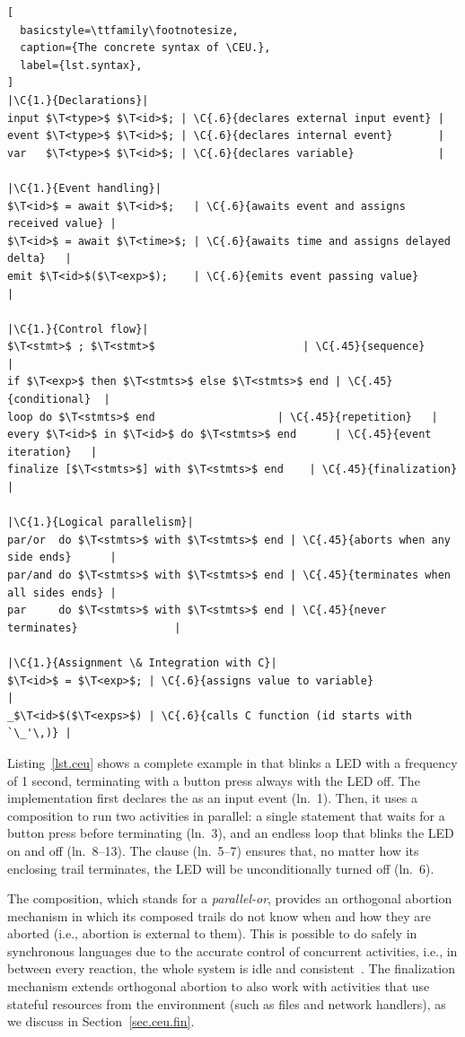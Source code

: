 \bgroup
\def\T<#1>{\langle\mathit{#1}\rangle}
\def\C#1#2{\hfill\rmfamily\itshape\makebox[#1\columnwidth][l]{//~#2}}
\begin{lstlisting}[
  basicstyle=\ttfamily\footnotesize,
  caption={The concrete syntax of \CEU.},
  label={lst.syntax},
]
|\C{1.}{Declarations}|
input $\T<type>$ $\T<id>$; | \C{.6}{declares external input event} |
event $\T<type>$ $\T<id>$; | \C{.6}{declares internal event}       |
var   $\T<type>$ $\T<id>$; | \C{.6}{declares variable}             |

|\C{1.}{Event handling}|
$\T<id>$ = await $\T<id>$;   | \C{.6}{awaits event and assigns received value} |
$\T<id>$ = await $\T<time>$; | \C{.6}{awaits time and assigns delayed delta}   |
emit $\T<id>$($\T<exp>$);    | \C{.6}{emits event passing value}               |

|\C{1.}{Control flow}|
$\T<stmt>$ ; $\T<stmt>$                       | \C{.45}{sequence}     |
if $\T<exp>$ then $\T<stmts>$ else $\T<stmts>$ end | \C{.45}{conditional}  |
loop do $\T<stmts>$ end                   | \C{.45}{repetition}   |
every $\T<id>$ in $\T<id>$ do $\T<stmts>$ end      | \C{.45}{event iteration}   |
finalize [$\T<stmts>$] with $\T<stmts>$ end    | \C{.45}{finalization} |

|\C{1.}{Logical parallelism}|
par/or  do $\T<stmts>$ with $\T<stmts>$ end | \C{.45}{aborts when any side ends}      |
par/and do $\T<stmts>$ with $\T<stmts>$ end | \C{.45}{terminates when all sides ends} |
par     do $\T<stmts>$ with $\T<stmts>$ end | \C{.45}{never terminates}               |

|\C{1.}{Assignment \& Integration with C}|
$\T<id>$ = $\T<exp>$; | \C{.6}{assigns value to variable}                |
_$\T<id>$($\T<exps>$) | \C{.6}{calls C function (id starts with `\_'\,)} |
\end{lstlisting}
\egroup

Listing~\ref{lst.ceu} shows a complete example in \CEU that blinks a LED with a
frequency of 1 second, terminating with a button press always with the LED off.
%
The implementation first declares the  as an input event (ln.~1).
Then, it uses a  composition to run two activities in parallel:
a single statement that waits for a button press before terminating (ln.~3),
and an endless loop that blinks the LED on and off (ln.~8--13).
The  clause (ln.~5--7) ensures that, no matter how its enclosing
trail terminates, the LED will be unconditionally turned off (ln.~6).

The  composition, which stands for a \emph{parallel-or}, provides
an orthogonal abortion mechanism in which its composed trails do not know when
and how they are aborted (i.e., abortion is external to them).
%
This is possible to do safely in synchronous languages due to the accurate
control of concurrent activities, i.e., in between every reaction, the whole
system is idle and consistent~\cite{esterel.preemption}.
%
The finalization mechanism extends orthogonal abortion to also work with
activities that use stateful resources from the environment (such as files and
network handlers), as we discuss in Section~\ref{sec.ceu.fin}.
%


